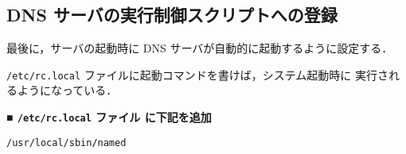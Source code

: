 \subsection{DNS サーバの実行制御スクリプトへの登録}
最後に，サーバの起動時に DNS サーバが自動的に起動するように設定する．

\texttt{/etc/rc.local} ファイルに起動コマンドを書けば，システム起動時に
実行されるようになっている．

\noindent
\textbf{■ \texttt{/etc/rc.local} ファイル に下記を追加}

\begin{center}
\begin{breakbox}
\begin{alltt}
/usr/local/sbin/named
\end{alltt}
\end{breakbox}
\end{center}

